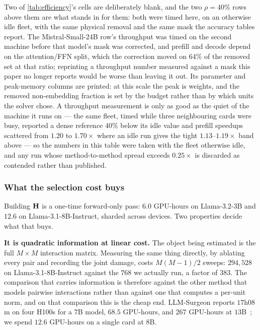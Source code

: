 Two of \cref{tab:efficiency}'s cells are deliberately blank, and the two $\rho{=}40\%$ rows above them are what stands in for them: both were timed here, on an otherwise idle fleet, with the same physical removal and the same mask the accuracy tables report. The Mistral-Small-24B row's throughput
was timed on the second machine before that model's mask was corrected, and prefill and decode depend
on the attention/FFN split, which the correction moved on $64\%$ of the removed set at that ratio;
reprinting a throughput number measured against a mask this paper no longer reports would be worse
than leaving it out. Its parameter and peak-memory columns are printed: at this scale the peak is
weights, and the removed non-embedding fraction is set by the budget rather than by which units the
solver chose. A throughput measurement is only as good as the quiet of the machine it runs on --- the
same fleet, timed while three neighbouring cards were busy, reported a dense reference $40\%$ below
its idle value and prefill speedups scattered from $1.20$ to $1.70\times$ where an idle run gives the
tight $1.13$--$1.19\times$ band above --- so the numbers in this table were taken with the fleet
otherwise idle, and any run whose method-to-method spread exceeds $0.25\times$ is discarded as
contended rather than published.

\begin{table}[htbp]
\centering\footnotesize
\caption{\textbf{Inference efficiency of every timed method at $20\%$}
(Llama-3.1-8B-Instruct, real physical removal, one RTX 6000 Ada). At iso-budget the throughput is a
method-independent band, so the differentiator is accuracy at a given speedup.}
\label{tab:efficiency-band}

\end{table}

\subsubsection{What the selection cost buys}
\label{app:selection-cost}

Building $\mathbf{H}$ is a one-time forward-only pass: $6.0$ GPU-hours on Llama-3.2-3B and $12.6$ on
Llama-3.1-8B-Instruct, sharded across devices. Two properties decide what that buys.

\textbf{It is quadratic information at linear cost.} The object being estimated is the full
$M\times M$ interaction matrix. Measuring the same thing directly, by ablating every pair and
recording the joint damage, costs $M(M{-}1)/2$ sweeps: $294{,}528$ on Llama-3.1-8B-Instruct against
the $768$ we actually run, a factor of $383$. The comparison that carries information is therefore
against the other method that models pairwise interactions rather than against one that computes a
per-unit norm, and on that comparison this is the cheap end. LLM-Surgeon reports
$17$h$08$m on four H100s for a $7$B model, $68.5$ GPU-hours, and $267$ GPU-hours at
$13$B~\citep{vanderouderaa2024llmsurgeon}; we spend $12.6$ GPU-hours on a single card at $8$B.

